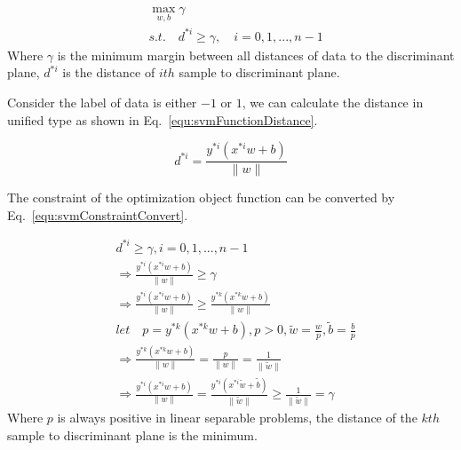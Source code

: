 \documentclass[runningheads,openany]{xhlPaper}
\begin{document}
\begin{equation}
\label{equ:svmOptimizationObjectFunction}
\begin{aligned}
&\mathop {\max }\limits_{w,b} \gamma \\
&s.t.\quad {d^{*i}} \ge \gamma,\quad i = 0,1,...,n - 1
\end{aligned}
\end{equation}
Where $\gamma$ is the minimum margin between all distances of data to the discriminant plane, $d^{*i}$ is the distance of $ith$ sample to discriminant plane.

Consider the label of data is either $-1$ or $1$, we can calculate the distance in unified type as shown in Eq.~\ref{equ:svmFunctionDistance}.

\begin{equation}
\label{equ:svmFunctionDistance}
{d^{*i}} = \frac{{{y^{*i}}\left( {{x^{*i}}w + b} \right)}}{{\parallel w\parallel }}
\end{equation}

The constraint of the optimization object function can be converted by Eq.~\ref{equ:svmConstraintConvert}.

\begin{equation}
\label{equ:svmConstraintConvert}
\begin{aligned}
&{d^{*i}} \ge \gamma ,i = 0,1,...,n - 1\\
 &\Rightarrow \frac{{{y^{*i}}\left( {{x^{*i}}w + b} \right)}}{{\parallel w\parallel }} \ge \gamma \\
 &\Rightarrow \frac{{{y^{*i}}\left( {{x^{*i}}w + b} \right)}}{{\parallel w\parallel }} \ge \frac{{{y^{*k}}\left( {{x^{*k}}w + b} \right)}}{{\parallel w\parallel }}\\
&let\quad  p = {y^{*k}}\left( {{x^{*k}}w + b} \right),p > 0,\tilde w = \frac{w}{p}, \tilde b = \frac{b}{p}\\
& \Rightarrow   \frac{{{y^{*k}}\left( {{x^{*k}}w + b} \right)}}{{\parallel w\parallel }} = \frac{p}{{\parallel w\parallel }} = \frac{1}{{\parallel \tilde w\parallel }}\\
& \Rightarrow \frac{{{y^{*i}}\left( {{x^{*i}}w + b} \right)}}{{\parallel w\parallel }} = \frac{{{y^{*i}}\left( {{x^{*i}}\tilde w + \tilde b} \right)}}{{\parallel \tilde w\parallel }} \ge \frac{1}{{\parallel \tilde w\parallel }} = \gamma 
\end{aligned}
\end{equation}
Where $p$ is always positive in linear separable problems, the distance of the $kth$ sample to discriminant plane is the minimum.
\end{document}
